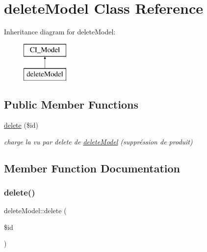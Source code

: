 \hypertarget{classdelete_model}{}\section{delete\+Model Class Reference}
\label{classdelete_model}
Inheritance diagram for delete\+Model\+:\begin{figure}[H]
\begin{center}
\leavevmode
\includegraphics[height=2.000000cm]{classdelete_model}
\end{center}
\end{figure}
\subsection*{Public Member Functions}
\begin{DoxyCompactItemize}
\item 
\mbox{\hyperlink{classdelete_model_a4523097872d8ca41646baf0031e96350}{delete}} (\$id)
\begin{DoxyCompactList}\small\item\em charge la vu par delete de \mbox{\hyperlink{classdelete_model}{delete\+Model}} (suppréssion de produit) \end{DoxyCompactList}\end{DoxyCompactItemize}


\subsection{Member Function Documentation}
\mbox{\label{classdelete_model_a4523097872d8ca41646baf0031e96350}} 
\subsubsection{\texorpdfstring{delete()}{delete()}}
{\footnotesize\ttfamily delete\+Model\+::delete (\begin{DoxyParamCaption}\item[{}]{\$id }\end{DoxyParamCaption})}



